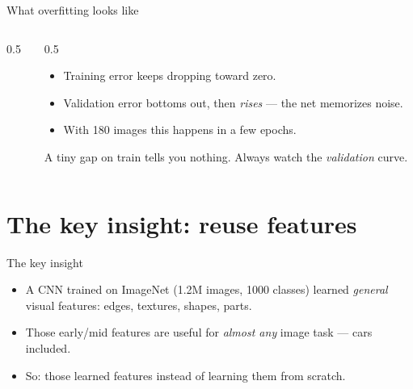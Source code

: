 \documentclass[10pt,aspectratio=169]{beamer}
\begin{document}
\begin{frame}{What overfitting looks like}
  \begin{columns}[T]
    \begin{column}{0.5\textwidth}
    \end{column}
    \begin{column}{0.5\textwidth}
      \begin{itemize}
        \item Training error keeps dropping toward zero.
        \item Validation error bottoms out, then \emph{rises} — the net memorizes noise.
        \item With 180 images this happens in a few epochs.
      \end{itemize}
      \begin{badbox}
        A tiny gap on train tells you nothing. Always watch the \emph{validation} curve.
      \end{badbox}
    \end{column}
  \end{columns}
\end{frame}

\section{The key insight: reuse features}

\begin{frame}{The key insight}
  \begin{itemize}
    \item A CNN trained on ImageNet (1.2M images, 1000 classes) learned \emph{general}
          visual features: edges, textures, shapes, parts.
    \item Those early/mid features are useful for \emph{almost any} image task — cars included.
    \item So:  those learned features instead of learning them from scratch.
  \end{itemize}
\end{frame}
\end{document}
